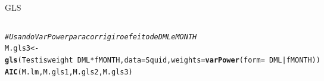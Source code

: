 \documentclass{beamer}\usepackage[]{graphicx}\usepackage[]{color}
\makeatletter
\newcommand{\hlcom}[1]{\textcolor[rgb]{0.678,0.584,0.686}{\textit{#1}}}%
\newcommand{\hlopt}[1]{\textcolor[rgb]{0,0,0}{#1}}%
\newcommand{\hlstd}[1]{\textcolor[rgb]{0.345,0.345,0.345}{#1}}%
\newcommand{\hlkwb}[1]{\textcolor[rgb]{0.69,0.353,0.396}{#1}}%
\newcommand{\hlkwc}[1]{\textcolor[rgb]{0.333,0.667,0.333}{#1}}%
\newcommand{\hlkwd}[1]{\textcolor[rgb]{0.737,0.353,0.396}{\textbf{#1}}}%
\newenvironment{kframe}{%
 \def\at@end@of@kframe{}%
 \ifinner\ifhmode%
  \def\at@end@of@kframe{\end{minipage}}%
  \begin{minipage}{\columnwidth}%
 \fi\fi%
 \def\FrameCommand##1{\hskip\@totalleftmargin \hskip-\fboxsep
 \colorbox{shadecolor}{##1}\hskip-\fboxsep
     \hskip-\linewidth \hskip-\@totalleftmargin \hskip\columnwidth}%
 \MakeFramed {\advance\hsize-\width
   \@totalleftmargin\z@ \linewidth\hsize
   \@setminipage}}%
 {\par\unskip\endMakeFramed%
 \at@end@of@kframe}
\newenvironment{knitrout}{}{} %
\renewenvironment{knitrout}{\setlength{\topsep}{0mm}}{}
\makeatother
\begin{document}
\begin{frame}[fragile]{GLS}

\begin{columns}[c]

\setlength{\topsep}{2pt}
\begin{knitrout}\tiny
{}\color{fgcolor}\begin{kframe}
\begin{alltt}
\hlcom{# Usando VarPower para corrigir o efeito de DML e MONTH}
\hlstd{M.gls3}\hlkwb{<-}\hlkwd{gls}\hlstd{(Testisweight} \hlopt{~} \hlstd{DML} \hlopt{*} \hlstd{fMONTH,} \hlkwc{data} \hlstd{= Squid,}\hlkwc{weights} \hlstd{=} \hlkwd{varPower}\hlstd{(}\hlkwc{form}\hlstd{=}\hlopt{~} \hlstd{DML} \hlopt{|} \hlstd{fMONTH))}
\hlkwd{AIC}\hlstd{(M.lm,M.gls1,M.gls2,M.gls3)}
\end{alltt}
\begin{verbatim}
##        df      AIC
## M.lm   25 3752.084
## M.gls1 25 3620.898
## M.gls2 36 3614.436
## M.gls3 37 3407.511
\end{verbatim}
\end{kframe}
\end{knitrout}

\begin{knitrout}
\color{fgcolor}
\includegraphics[width=0.7\linewidth]{figure/glsp4-1} 


\end{knitrout}
\end{columns}
\end{frame}
\end{document}
